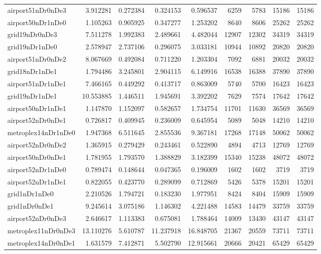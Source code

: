 \begin{longtable}{|l|r|r|r|r|r|r|r|r|}
airport51nDr0nDe3 & 3.912281 & 0.272384 & 0.324153 & 0.596537 & 6259 & 5783 & 15186 & 15186 \\
airport50nDr1nDe0 & 1.105263 & 0.905925 & 0.347277 & 1.253202 & 8640 & 8606 & 25262 & 25262 \\
grid19nDr0nDe3 & 7.511278 & 1.992383 & 2.489661 & 4.482044 & 12907 & 12302 & 34319 & 34319 \\
grid19nDr1nDe0 & 2.578947 & 2.737106 & 0.296075 & 3.033181 & 10944 & 10892 & 20820 & 20820 \\
airport51nDr0nDe2 & 8.067669 & 0.492084 & 0.711220 & 1.203304 & 7092 & 6881 & 20032 & 20032 \\
grid18nDr1nDe1 & 1.794486 & 3.245801 & 2.904115 & 6.149916 & 16538 & 16388 & 37890 & 37890 \\
airport51nDr1nDe1 & 7.466165 & 0.449292 & 0.413717 & 0.863009 & 5740 & 5700 & 16423 & 16423 \\
grid19nDr1nDe1 & 10.553885 & 1.446511 & 1.945691 & 3.392202 & 7629 & 7574 & 17642 & 17642 \\
airport50nDr1nDe1 & 1.147870 & 1.152097 & 0.582657 & 1.734754 & 11701 & 11630 & 36569 & 36569 \\
airport52nDr0nDe1 & 0.726817 & 0.409945 & 0.236009 & 0.645954 & 5089 & 5048 & 14210 & 14210 \\
metroplex14nDr1nDe0 & 1.947368 & 6.511645 & 2.855536 & 9.367181 & 17268 & 17148 & 50062 & 50062 \\
airport52nDr0nDe2 & 1.365915 & 0.279429 & 0.243461 & 0.522890 & 4894 & 4713 & 12769 & 12769 \\
airport50nDr0nDe1 & 1.781955 & 1.793570 & 1.388829 & 3.182399 & 15340 & 15238 & 48072 & 48072 \\
airport52nDr1nDe0 & 0.789474 & 0.148644 & 0.047365 & 0.196009 & 1602 & 1602 & 3719 & 3719 \\
airport52nDr1nDe1 & 0.822055 & 0.423770 & 0.289099 & 0.712869 & 5426 & 5378 & 15201 & 15201 \\
grid1nDr1nDe0 & 2.210526 & 1.794721 & 0.183230 & 1.977951 & 8424 & 8404 & 15909 & 15909 \\
grid1nDr0nDe1 & 9.245614 & 3.075186 & 1.146302 & 4.221488 & 14583 & 14479 & 33759 & 33759 \\
airport52nDr0nDe3 & 2.646617 & 1.113383 & 0.675081 & 1.788464 & 14009 & 13430 & 43147 & 43147 \\
metroplex11nDr0nDe3 & 13.110276 & 5.610787 & 11.237918 & 16.848705 & 21367 & 20559 & 73711 & 73711 \\
metroplex14nDr0nDe1 & 1.631579 & 7.412871 & 5.502790 & 12.915661 & 20666 & 20421 & 65429 & 65429 \\

\end{longtable}

